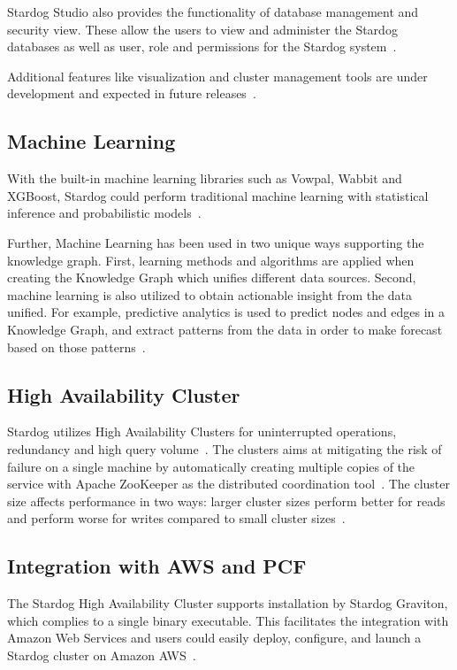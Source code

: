 		Stardog Studio also provides the functionality of database management 
		and security view. These allow the users to view and administer the 
		Stardog databases as well as user, role and permissions for the Stardog 
		system~\cite{hid-sp18-405-blog-stardog-studio}.
		
		Additional features like visualization and cluster management tools are 
		under development and expected in future 
		releases~\cite{hid-sp18-405-www-stardog-studio}.

	\subsection{Machine Learning}
		With the built-in machine learning libraries such as Vowpal, Wabbit and 
		XGBoost, Stardog could perform traditional machine learning with 
		statistical	inference and probabilistic 
		models~\cite{hid-sp18-405-blog-stardog-xgboost}. 
		
		Further, Machine Learning has been used in two unique ways 
		supporting the knowledge graph. First, learning methods and algorithms 
		are applied when creating  the Knowledge Graph which unifies different 
		data sources. Second,  machine learning is also utilized to obtain 
		actionable insight from the data unified. For example, predictive 
		analytics is used to predict nodes and edges in a Knowledge Graph, and 
		extract patterns from the data in order to make forecast based on those 
		patterns~\cite{hid-sp18-405-blog-stardog-ml}.


	\subsection{High Availability Cluster}
		Stardog utilizes High Availability Clusters for uninterrupted operations, 
		redundancy and high query 
		volume~\cite{hid-sp18-405-www-stardog-docs}. 
		The clusters aims at mitigating the risk of failure on a single machine by 
		automatically creating multiple copies of the service with Apache 
		ZooKeeper as the distributed coordination 
		tool~\cite{hid-sp18-405-www-stardog-predictiveanalyticstoday}. The 
		cluster size affects performance in two ways: larger cluster sizes 
		perform better for reads and perform worse for writes compared to 
		small cluster sizes~\cite{hid-sp18-405-www-stardog-docs}. 

	\subsection{Integration with AWS and PCF}
		The Stardog High Availability Cluster supports installation by Stardog 
		Graviton, which complies to a single binary executable. This facilitates 
		the integration with Amazon Web Services and users could easily 
		deploy, configure, and launch a Stardog cluster on Amazon 
		AWS~\cite{hid-sp18-405-blog-stardog-aws}. 
		
